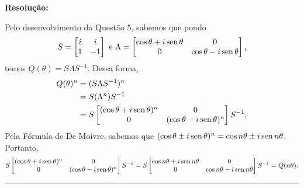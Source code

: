\documentclass[leqno]{article}
\numberwithin{equation}{section}
\newenvironment{sol} 
{
    \vspace{4mm}
    \noindent\textbf{Resolução:}
    \strut\newline
    \smallskip
    \hspace{-3.5mm} 
} 
{\noindent\rule{4cm}{.1mm}}
\begin{document}
\begin{enumerate}
\begin{sol}
    Pelo desenvolvimento da Questão \( 5 \), sabemos que pondo
    \begin{equation*}
        S =
        \begin{bmatrix}
            i & i \\
            1 & -1
        \end{bmatrix}
        \text{ e }
        \Lambda =
        \begin{bmatrix}
            \cos \theta + i \operatorname{sen} \theta & 0 \\
            0 & \cos \theta - i \operatorname{sen} \theta
        \end{bmatrix}
    ,\end{equation*}
    temos \( Q ( \theta ) = S \Lambda S^{ -1 } \).
    Dessa forma,
    \begin{align*}
        Q ( \theta )^{ n } &= ( S \Lambda S^{ -1 } )^{ n } \\
                           &= S ( \Lambda^{ n } ) S^{ -1 } \\
                           &=
                           S
                           \begin{bmatrix}
                                ( \cos \theta + i \operatorname{sen} \theta )^{ n } & 0 \\
                                0 & ( \cos \theta - i \operatorname{sen} \theta )^{ n }
                           \end{bmatrix}
                           S^{ -1 }
    .\end{align*}
    Pela Fórmula de De Moivre, sabemos que \( ( \cos \theta \pm i \operatorname{sen} \theta )^{ n } = \cos n \theta \pm i \operatorname{sen} n \theta \).
    Portanto,
    \begin{equation*}
        S
        \begin{bmatrix}
             ( \cos \theta + i \operatorname{sen} \theta )^{ n } & 0 \\
             0 & ( \cos \theta - i \operatorname{sen} \theta )^{ n }
        \end{bmatrix}
        S^{ -1 }
        =
        S
        \begin{bmatrix}
             \cos n \theta + i \operatorname{sen} n \theta & 0 \\
             0 & \cos n \theta - i \operatorname{sen} n \theta
        \end{bmatrix}
        S^{ -1 }
        = Q ( n \theta )
    .\end{equation*}
\end{sol}



\end{enumerate}
\end{document}
